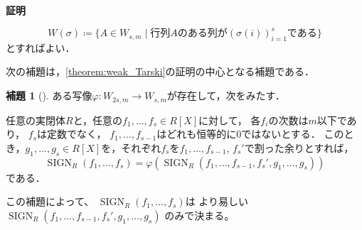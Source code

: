 \documentclass[uplatex, dvipdfmx]{jsarticle}
\makeatletter
\numberwithin{equation}{section}
\renewenvironment{proof}[1][\proofname]{\par
  \pushQED{\qed}%
  \normalfont \topsep6\p@\@plus6\p@\relax
  \trivlist
  \item\relax
  {\bfseries
  #1\@addpunct{.}}\hspace\labelsep\ignorespaces
}{
  \popQED\endtrivlist\@endpefalse
}
\newcommand{\map}[3]{{#1}\colon{#2}\rightarrow{#3}}
\DeclareMathOperator{\SIGN}{SIGN}
\theoremstyle{definition}
\newtheorem{lemma}[definition]{補題}
\renewcommand{\proofname}{\textbf{証明}}
\makeatother
\begin{document}
\begin{proof}
     \begin{equation}
          W(\sigma)\coloneqq\{A \in W_{s,m} \mid \text{行列$A$のある列が$(\sigma(i))_{i=1}^s$である}\}
     \end{equation}
     とすればよい．
\end{proof}

次の補題は，\cref{theorem:weak_Tarski}の証明の中心となる補題である．

\begin{lemma}[{\cite[Lemma 1.4.5]{MR1659509}}]\label{lemma:qe_lowering}
     ある写像$\map{\varphi}{W_{2s,m}}{W_{s,m}}$が存在して，次をみたす．

     任意の実閉体$R$と，任意の$f_1, \dots, f_s \in R[X]$に対して，
     各$f_i$の次数は$m$以下であり，
     $f_s$は定数でなく，
     $f_1, \dots, f_{s-1}$はどれも恒等的に$0$ではないとする．
     このとき，$g_1, \dots, g_s \in R[X]$を，それぞれ$f_s$を$f_1, \dots, f_{s-1}$, $f_s'$で割った余りとすれば，
     \begin{equation}
          \SIGN_R(f_1, \dots, f_s) = \varphi(\SIGN_R(f_1, \dots, f_{s-1}, f_s', g_1, \dots, g_s))
     \end{equation}
     である．
\end{lemma}

この補題によって、
$\SIGN_R(f_1, \dots, f_s)$は
より易しい
$
\SIGN_R(f_1, \dots, f_{s-1}, f_s', g_1, \dots, g_s)
$
のみで決まる。
\end{document}
